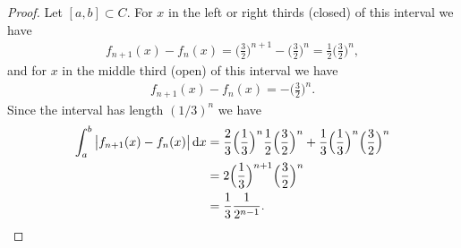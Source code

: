 \begin{proof}
  Let $[a, b] \subset C$. For $x$ in the left or right thirds (closed) of this interval we have
  \begin{align*}
    f_{n+1}(x) - f_n(x)
    = \Big(\frac{3}{2}\Big)^{n+1} - \Big(\frac{3}{2}\Big)^{n}
    = \frac{1}{2}\Big(\frac{3}{2}\Big)^n,
  \end{align*}
  and for $x$ in the middle third (open) of this interval we have
  \begin{align*}
    f_{n+1}(x) - f_n(x)
    = -\Big(\frac{3}{2}\Big)^{n}.
  \end{align*}
  Since the interval has length $(1/3)^n$ we have
  \begin{align*}
    \int_a^b \big|f_{n+1}(x) - f_n(x)\big| \dx
    &=  \frac{2}{3}\Big(\frac{1}{3}\Big)^n\frac{1}{2}\Big(\frac{3}{2}\Big)^n
      + \frac{1}{3}\Big(\frac{1}{3}\Big)^n\Big(\frac{3}{2}\Big)^n \\
    &= 2\Big(\frac{1}{3}\Big)^{n+1}\Big(\frac{3}{2}\Big)^n\\
    &= \frac{1}{3}\frac{1}{2^{n-1}}.
  \end{align*}
\end{proof}



